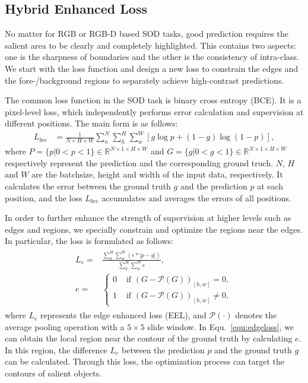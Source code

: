 \documentclass[runningheads]{llncs}
\begin{document}
\subsection{Hybrid Enhanced Loss}

No matter for RGB or RGB-D based SOD tasks, good prediction requires the salient area to be clearly and completely highlighted. This contains two aspects: one is the sharpness of boundaries and the other is the consistency of intra-class.
We start with the loss function and design a new loss to constrain the edges and the fore-/background regions to separately achieve high-contrast predictions.

The common loss function in the SOD task is binary cross entropy (BCE). It is a pixel-level loss, which independently performs error calculation and supervision at different positions. The main form is as follows:
\begin{equation}
 \begin{split}
  L_{bce} & = \frac{1}{N \times H \times W}\sum^N_n \sum^H_h\sum^W_w \left [ g \log p + (1 - g) \log (1 - p) \right ],
 \end{split}
 \label{equ:bceloss}
\end{equation}
\noindent where $P = \{ p | 0 < p < 1 \} \in \mathbb{R}^{N \times 1 \times H \times W}$ and $G = \{ g | 0 < g < 1 \} \in \mathbb{R}^{N \times 1 \times H \times W}$ respectively represent the prediction and the corresponding ground truch. $N$, $H$ and $W$ are the batchsize, height and width of the input data, respectively. It calculates the error between the ground truth $g$ and the prediction $p$ at each position, and the loss $L_{bce}$ accumulates and averages the errors of all positions.

In order to further enhance the strength of supervision at higher levels such as edges and regions, we specially constrain and optimize the regions near the edges. In particular, the loss is formulated as follows:
\begin{align}
 \begin{split}
  L_{e} = & \frac{\sum^{H}_{h}\sum^{W}_{w} (e * |p - g|)}{\sum^{H}_{h}\sum^{W}_{w} e}, \\
  e =     & \left \{ \begin{matrix}
   0 & \text{ if } (G - \mathcal{P}(G))_{[h,w]} = 0,   \\
   1 & \text{ if } (G - \mathcal{P}(G))_{[h,w]} \ne 0,
  \end{matrix} \right.
 \end{split}
 \label{equ:edgeloss}
\end{align}
\noindent where $L_{e}$ represents the edge enhanced loss (EEL), and $\mathcal{P}(\cdot)$ denotes the average pooling operation with a $5 \times 5$ slide window.
In Equ.~\ref{equ:edgeloss}, we can obtain the local region near the contour of the ground truth by calculating $e$. In this region, the difference $L_e$ between the prediction $p$ and the ground truth $g$ can be calculated. Through this loss, the optimization process can target the contours of salient objects.
\end{document}
